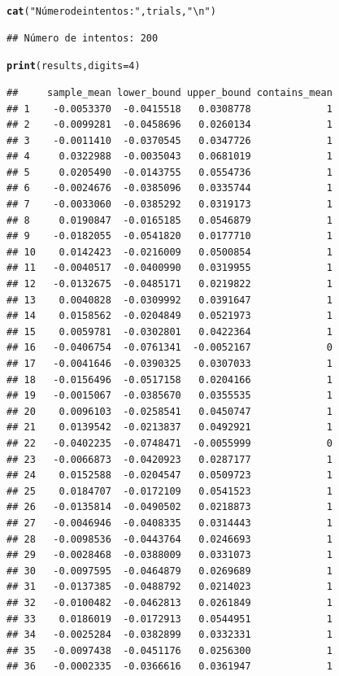 \documentclass[12pt]{article}\usepackage[]{graphicx}\usepackage[]{xcolor}
\makeatletter
\newcommand{\hlnum}[1]{\textcolor[rgb]{0.686,0.059,0.569}{#1}}%
\newcommand{\hlsng}[1]{\textcolor[rgb]{0.192,0.494,0.8}{#1}}%
\newcommand{\hldef}[1]{\textcolor[rgb]{0.345,0.345,0.345}{#1}}%
\newcommand{\hlkwc}[1]{\textcolor[rgb]{0.333,0.667,0.333}{#1}}%
\newcommand{\hlkwd}[1]{\textcolor[rgb]{0.737,0.353,0.396}{\textbf{#1}}}%
\newenvironment{kframe}{%
 \def\at@end@of@kframe{}%
 \ifinner\ifhmode%
  \def\at@end@of@kframe{\end{minipage}}%
  \begin{minipage}{\columnwidth}%
 \fi\fi%
 \def\FrameCommand##1{\hskip\@totalleftmargin \hskip-\fboxsep
 \colorbox{shadecolor}{##1}\hskip-\fboxsep
     \hskip-\linewidth \hskip-\@totalleftmargin \hskip\columnwidth}%
 \MakeFramed {\advance\hsize-\width
   \@totalleftmargin\z@ \linewidth\hsize
   \@setminipage}}%
 {\par\unskip\endMakeFramed%
 \at@end@of@kframe}
\newenvironment{knitrout}{}{} %
\makeatother
\begin{document}
\begin{knitrout}
\begin{kframe}
\begin{alltt}
\hlkwd{cat}\hldef{(}\hlsng{"Número de intentos:"}\hldef{, trials,} \hlsng{"\textbackslash{}n"}\hldef{)}
\end{alltt}
\begin{verbatim}
## Número de intentos: 200
\end{verbatim}
\begin{alltt}
\hlkwd{print}\hldef{(results,} \hlkwc{digits}\hldef{=} \hlnum{4}\hldef{)}
\end{alltt}
\begin{verbatim}
##     sample_mean lower_bound upper_bound contains_mean
## 1    -0.0053370  -0.0415518   0.0308778             1
## 2    -0.0099281  -0.0458696   0.0260134             1
## 3    -0.0011410  -0.0370545   0.0347726             1
## 4     0.0322988  -0.0035043   0.0681019             1
## 5     0.0205490  -0.0143755   0.0554736             1
## 6    -0.0024676  -0.0385096   0.0335744             1
## 7    -0.0033060  -0.0385292   0.0319173             1
## 8     0.0190847  -0.0165185   0.0546879             1
## 9    -0.0182055  -0.0541820   0.0177710             1
## 10    0.0142423  -0.0216009   0.0500854             1
## 11   -0.0040517  -0.0400990   0.0319955             1
## 12   -0.0132675  -0.0485171   0.0219822             1
## 13    0.0040828  -0.0309992   0.0391647             1
## 14    0.0158562  -0.0204849   0.0521973             1
## 15    0.0059781  -0.0302801   0.0422364             1
## 16   -0.0406754  -0.0761341  -0.0052167             0
## 17   -0.0041646  -0.0390325   0.0307033             1
## 18   -0.0156496  -0.0517158   0.0204166             1
## 19   -0.0015067  -0.0385670   0.0355535             1
## 20    0.0096103  -0.0258541   0.0450747             1
## 21    0.0139542  -0.0213837   0.0492921             1
## 22   -0.0402235  -0.0748471  -0.0055999             0
## 23   -0.0066873  -0.0420923   0.0287177             1
## 24    0.0152588  -0.0204547   0.0509723             1
## 25    0.0184707  -0.0172109   0.0541523             1
## 26   -0.0135814  -0.0490502   0.0218873             1
## 27   -0.0046946  -0.0408335   0.0314443             1
## 28   -0.0098536  -0.0443764   0.0246693             1
## 29   -0.0028468  -0.0388009   0.0331073             1
## 30   -0.0097595  -0.0464879   0.0269689             1
## 31   -0.0137385  -0.0488792   0.0214023             1
## 32   -0.0100482  -0.0462813   0.0261849             1
## 33    0.0186019  -0.0172913   0.0544951             1
## 34   -0.0025284  -0.0382899   0.0332331             1
## 35   -0.0097438  -0.0451176   0.0256300             1
## 36   -0.0002335  -0.0366616   0.0361947             1

\end{verbatim}
\end{kframe}
\end{knitrout}
\end{document}
